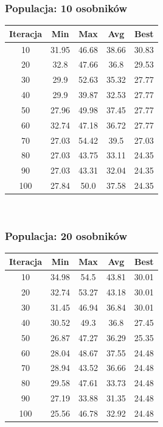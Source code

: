 \documentclass[a4paper,11pt]{article}
\begin{document}
			\subsubsection{Populacja: 10 osobników}
				\begin{tabular}{|c|c|c|c|c|}
					\hline 
					Iteracja &  Min &  Max & Avg & Best\\
					\hline
					10 & 31.95 & 46.68 & 38.66 & 30.83\\
					\hline
					20 & 32.8 & 47.66 & 36.8 & 29.53\\
					\hline
					30 & 29.9 & 52.63 & 35.32 & 27.77\\
					\hline
					40 & 29.9 & 39.87 & 32.53 & 27.77\\
					\hline
					50 & 27.96 & 49.98 & 37.45 & 27.77\\
					\hline
					60 & 32.74 & 47.18 & 36.72 & 27.77\\
					\hline
					70 & 27.03 & 54.42 & 39.5 & 27.03\\
					\hline
					80 & 27.03 & 43.75 & 33.11 & 24.35\\
					\hline
					90 & 27.03 & 43.31 & 32.04 & 24.35\\
					\hline
					100 & 27.84 & 50.0 & 37.58 & 24.35\\
					\hline
				\end{tabular} \\
			\subsubsection{Populacja: 20 osobników}
				\begin{tabular}{|c|c|c|c|c|}
					\hline 
					Iteracja &  Min &  Max & Avg & Best\\
					\hline
					10 & 34.98 & 54.5 & 43.81 & 30.01\\
					\hline
					20 & 32.74 & 53.27 & 43.18 & 30.01\\
					\hline
					30 & 31.45 & 46.94 & 36.84 & 30.01\\
					\hline
					40 & 30.52 & 49.3 & 36.8 & 27.45\\
					\hline
					50 & 26.87 & 47.27 & 36.29 & 25.35\\
					\hline
					60 & 28.04 & 48.67 & 37.55 & 24.48\\
					\hline
					70 & 28.94 & 43.52 & 36.66 & 24.48\\
					\hline
					80 & 29.58 & 47.61 & 33.73 & 24.48\\
					\hline
					90 & 27.19 & 33.88 & 31.35 & 24.48\\
					\hline
					100 & 25.56 & 46.78 & 32.92 & 24.48\\
					\hline
				\end{tabular} \\
\end{document}
